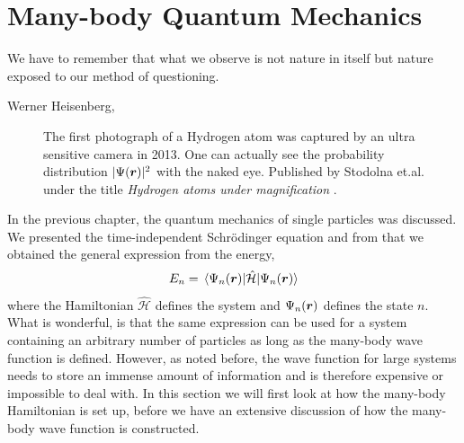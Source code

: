 \chapter{Many-body Quantum Mechanics} \label{chp:manybody}
\epigraph{We have to remember that what we observe is not nature in itself but
	nature exposed to our method of questioning.}{Werner Heisenberg, \cite{heisenberg_across_1990}}
\begin{figure}[H]
	\centering
	\captionsetup[subfigure]{labelformat=empty}
	\caption{The first photograph of a Hydrogen atom was captured by an ultra sensitive camera in 2013. One can actually see the probability distribution $|\Psi(\boldsymbol{{r}})|^2$ with the naked eye. Published by Stodolna et.al. under the title \textit{Hydrogen atoms under magnification} \cite{stodolna_hydrogen_2013}.}
\end{figure}

In the previous chapter, the quantum mechanics of single particles was discussed. We presented the time-independent Schrödinger equation and from that we obtained the general expression from the energy,
\begin{equation}
E_n=\mel{\Psi_n(\bs{r})}{\hat{\mathcal{H}}}{\Psi_n(\bs{r})}
\label{eq:energy}
\end{equation}
where the Hamiltonian $\hat{\mathcal{H}}$ defines the system and $\Psi_n(\boldsymbol{{r}})$ defines the state $n$. What is wonderful, is that the same expression can be used for a system containing an arbitrary number of particles as long as the many-body wave function is defined. However, as noted before, the wave function for large systems needs to store an immense amount of information and is therefore expensive or impossible to deal with. In this section we will first look at how the many-body Hamiltonian is set up, before we have an extensive discussion of how the many-body wave function is constructed.

